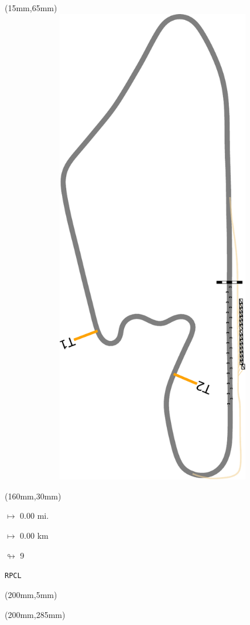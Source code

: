 \begin{textblock*}{185mm}(15mm,65mm)%
\centering
\mbox{\includegraphics[width=185mm,height=210mm,keepaspectratio]{PT/RPCL.pdf}}
\end{textblock*}
\begin{textblock*}{40mm}(160mm,30mm)%
\Large
\par$\mapsto$ 0.00 mi.
\par$\mapsto$ 0.00 km
\par$\looparrowright$ 9
\par\hfill\tiny\tt RPCL\\
\end{textblock*}
\begin{textblock*}{20mm}(200mm,5mm)%
\fbox{\thepage}
\label{RPCL}
\end{textblock*}
\begin{textblock*}{20mm}(200mm,285mm)%
\fbox{\thepage}
\end{textblock*}

